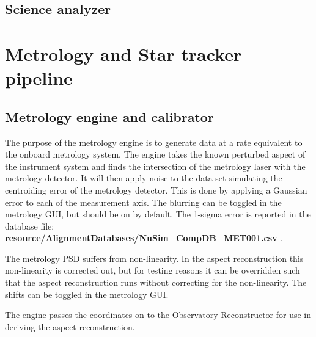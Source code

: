 \subsection{Science analyzer}

\section{Metrology and Star tracker pipeline}
\subsection{Metrology engine and calibrator}
The purpose of the metrology engine is to generate data at a rate equivalent to the onboard metrology system. The engine takes the known perturbed aspect of the instrument system and finds the intersection of the metrology laser with the metrology detector. It will then apply noise to the data set simulating the centroiding error of the metrology detector. This is done by applying a Gaussian error to each of the measurement axis. The blurring can be toggled in the metrology GUI, but should be on by default. The 1-sigma error is reported in the database file:\\ \textbf{resource/AlignmentDatabases/NuSim\_CompDB\_MET001.csv} . 

The metrology PSD suffers from non-linearity. In the aspect reconstruction this non-linearity is corrected out, but for testing reasons it can be overridden such that the aspect reconstruction runs without correcting for the non-linearity. The shifts can be toggled in the metrology GUI.

The engine passes the coordinates on to the Observatory Reconstructor for use in deriving the aspect reconstruction.

